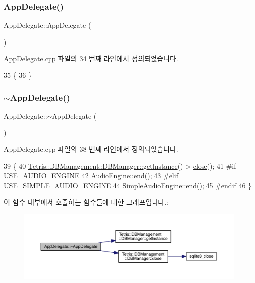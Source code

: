 \subsubsection{\texorpdfstring{App\+Delegate()}{AppDelegate()}}
{\footnotesize\ttfamily App\+Delegate\+::\+App\+Delegate (\begin{DoxyParamCaption}{ }\end{DoxyParamCaption})}



App\+Delegate.\+cpp 파일의 34 번째 라인에서 정의되었습니다.


\begin{DoxyCode}
35 \{
36 \}
\end{DoxyCode}
\mbox{\label{class_app_delegate_a9f89424b5e296e3668deaa0265fc5ac1}} 
\subsubsection{\texorpdfstring{$\sim$\+App\+Delegate()}{~AppDelegate()}}
{\footnotesize\ttfamily App\+Delegate\+::$\sim$\+App\+Delegate (\begin{DoxyParamCaption}{ }\end{DoxyParamCaption})\hspace{0.3cm}{\ttfamily [virtual]}}



App\+Delegate.\+cpp 파일의 38 번째 라인에서 정의되었습니다.


\begin{DoxyCode}
39 \{
40     \hyperlink{class_tetris_1_1_d_b_management_1_1_d_b_manager_a9cb81505055490211a9b5c79c3c22c18}{Tetris::DBManagement::DBManager::getInstance}()->
      \hyperlink{class_tetris_1_1_d_b_management_1_1_d_b_manager_a8390e6ddf3fa06e90fa5c2ab4997e5c1}{close}();
41 \textcolor{preprocessor}{#if USE\_AUDIO\_ENGINE}
42     AudioEngine::end();
43 \textcolor{preprocessor}{#elif USE\_SIMPLE\_AUDIO\_ENGINE}
44     SimpleAudioEngine::end();
45 \textcolor{preprocessor}{#endif}
46 \}
\end{DoxyCode}
이 함수 내부에서 호출하는 함수들에 대한 그래프입니다.\+:
\nopagebreak
\begin{figure}[H]
\begin{center}
\leavevmode
\includegraphics[width=350pt]{d5/d5d/class_app_delegate_a9f89424b5e296e3668deaa0265fc5ac1_cgraph}
\end{center}
\end{figure}



